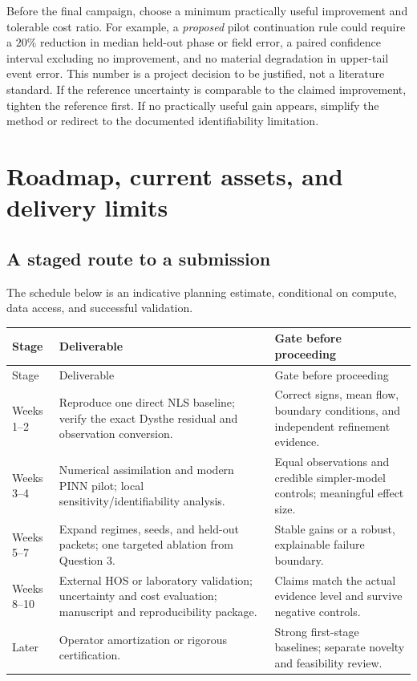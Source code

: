Before the final campaign, choose a minimum practically useful improvement
and tolerable cost ratio. For example, a \emph{proposed} pilot continuation
rule could require a $20\%$ reduction in median held-out phase or
field error, a paired confidence interval excluding no improvement, and
no material degradation in upper-tail event error. This number is a
project decision to be justified, not a literature standard. If the
reference uncertainty is comparable to the claimed improvement, tighten
the reference first. If no practically useful gain appears, simplify
the method or redirect to the documented identifiability limitation.

\clearpage
\section{Roadmap, current assets, and delivery limits}
\subsection{A staged route to a submission}
The schedule below is an indicative planning estimate, conditional on
compute, data access, and successful validation.
\begin{longtable}{@{}P{0.15\textwidth}P{0.43\textwidth}P{0.34\textwidth}@{}}
\toprule
Stage & Deliverable & Gate before proceeding \\
\midrule
\endfirsthead
\toprule
Stage & Deliverable & Gate before proceeding \\
\midrule
\endhead
Weeks 1--2 & Reproduce one direct NLS baseline; verify the exact
Dysthe residual and observation conversion. & Correct signs, mean flow,
boundary conditions, and independent refinement evidence. \\
Weeks 3--4 & Numerical assimilation and modern PINN pilot;
local sensitivity/identifiability analysis. & Equal observations and
credible simpler-model controls; meaningful effect size. \\
Weeks 5--7 & Expand regimes, seeds, and held-out packets;
one targeted ablation from Question 3. & Stable gains or a robust,
explainable failure boundary. \\
Weeks 8--10 & External HOS or laboratory validation; uncertainty
and cost evaluation; manuscript and reproducibility package. &
Claims match the actual evidence level and survive negative controls. \\
Later & Operator amortization or rigorous certification. &
Strong first-stage baselines; separate novelty and feasibility review. \\
\bottomrule
\end{longtable}

